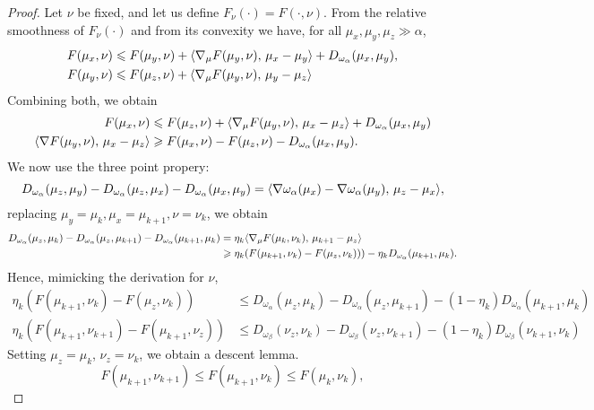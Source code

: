 \documentclass[a4paper, 10pt]{article}
\begin{document}
\begin{proof}
Let $\nu$ be fixed, and let us define $F_\nu(\cdot) = F(\cdot, \nu)$. From the relative
smoothness of $F_\nu(\cdot)$ and from its convexity we have, for all 
$\mu_x, \mu_y, \mu_z \gg \alpha$,
\begin{align}
    F(\mu_x, \nu) &\leqslant F(\mu_y, \nu)
     + \langle \nabla_\mu F(\mu_y, \nu),\,\mu_x- \mu_y\rangle + D_{\omega_\alpha}(\mu_x, \mu_y), \\
    F(\mu_y, \nu) &\leqslant F(\mu_z, \nu) + \langle \nabla_\mu F(\mu_y, \nu),\,\mu_y - \mu_z\rangle
\end{align}
Combining both, we obtain
\begin{align}
    F(\mu_x, \nu) &\leqslant F(\mu_z, \nu) + 
    \langle \nabla_\mu F(\mu_y, \nu),\,\mu_x - \mu_z\rangle + D_{\omega_\alpha}(\mu_x, \mu_y) \\
    \langle \nabla F(\mu_y, \nu),\,\mu_x - \mu_z\rangle 
    &\geqslant F(\mu_x, \nu) - F(\mu_z, \nu) - D_{\omega_\alpha}(\mu_x, \mu_y).
\end{align}
We now use the three point propery:
\begin{equation}
    D_{\omega_\alpha}(\mu_z, \mu_y) - D_{\omega_\alpha}(\mu_z, \mu_x) 
    - D_{\omega_\alpha}(\mu_x, \mu_y) 
    = \langle \nabla \omega_\alpha(\mu_x) - \nabla \omega_\alpha(\mu_y),\,\mu_z - \mu_x\rangle,
\end{equation}
replacing $\mu_y = \mu_{k}, \mu_x = \mu_{k+1}, \nu = \nu_k$, we obtain
\begin{align}
    D_{\omega_\alpha}(\mu_z, \mu_k) - D_{\omega_\alpha}(\mu_z, \mu_{k+1}) 
    - D_{\omega_\alpha}(\mu_{k+1}, \mu_k) &=
     \eta_k \langle \nabla_\mu F(\mu_k, \nu_k),\,\mu_{k+1} - \mu_z\rangle \\
    &\geqslant \eta_k (F(\mu_{k+1}, \nu_k) - F(\mu_z, \nu_k)))
     - \eta_k D_{\omega_\alpha}   (\mu_{k+1},\mu_k).
\end{align}
Hence, mimicking the derivation for $\nu$,
\begin{align}\label{eq:mirror_ineq}
    \eta_k (F(\mu_{k+1},\nu_k) - F(\mu_z, \nu_k)) &\leq 
    D_{\omega_\alpha}(\mu_z, \mu_k) - D_{\omega_\alpha}(\mu_z, \mu_{k+1}) 
    - (1 - \eta_k) D_{\omega_\alpha}(\mu_{k+1}, \mu_k) \\
    \eta_k (F(\mu_{k+1},\nu_{k+1}) - F(\mu_{k+1}, \nu_z)) &\leq 
    D_{\omega_\beta}(\nu_z, \nu_k) - D_{\omega_\beta}(\nu_z, \nu_{k+1}) 
    - (1 - \eta_k) D_{\omega_\beta}(\nu_{k+1}, \nu_k)
\end{align}
Setting $\mu_z = \mu_{k}$, $\nu_z = \nu_k$, we obtain a descent lemma.
\begin{equation}
    F(\mu_{k+1}, \nu_{k+1}) \leq F(\mu_{k+1}, \nu_{k}) \leq F(\mu_{k}, \nu_{k}),

\end{equation}
\end{proof}
\end{document}
